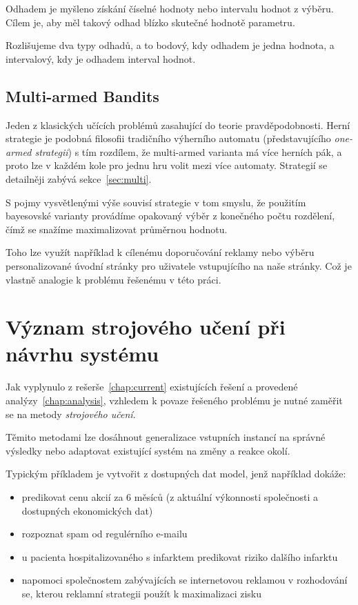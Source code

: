 \documentclass[thesis=M,czech]{FITthesis}[2014/05/07]
\begin{document}
Odhadem je myšleno získání číselné hodnoty nebo intervalu hodnot z výběru. Cílem je, aby měl takový odhad blízko skutečné hodnotě parametru.

Rozlišujeme dva typy odhadů, a to bodový, kdy odhadem je jedna hodnota, a intervalový, kdy je odhadem interval hodnot. 

\subsection{Multi-armed Bandits}
\label{sub:mabandit}
Jeden z klasických učících problémů zasahující do teorie pravděpodobnosti. Herní strategie je podobná filosofii tradičního výherního automatu (představujícího \emph{one-armed strategii}) s tím rozdílem, že multi-armed varianta má více herních pák, a proto lze v každém kole pro jednu hru volit mezi více automaty. Strategií se detailněji zabývá sekce~\ref{sec:multi}.

S pojmy vysvětlenými výše souvisí strategie v tom smyslu, že použitím bayesovské varianty provádíme opakovaný výběr z konečného počtu rozdělení, čímž se snažíme maximalizovat průměrnou hodnotu.

Toho lze využít například k cílenému doporučování reklamy nebo výběru personalizované úvodní stránky pro uživatele vstupujícího na naše stránky. Což je vlastně analogie k problému řešenému v této práci.

\section{Význam strojového učení při návrhu systému}
\label{sec:machine}

Jak vyplynulo z rešerše~\ref{chap:current} existujících řešení a provedené analýzy~\ref{chap:analysis}, vzhledem k povaze řešeného problému je nutné zaměřit se na metody \emph{strojového učení}. 

Těmito metodami lze dosáhnout generalizace vstupních instancí na správné výsledky nebo adaptovat existující systém na změny a reakce okolí. 

Typickým příkladem je vytvořit z dostupných dat model, jenž například dokáže:

\begin{itemize}
  \item predikovat cenu akcií za 6 měsíců (z aktuální výkonnosti společnosti a dostupných ekonomických dat)
  \item rozpoznat spam od regulérního e-mailu
  \item u pacienta hospitalizovaného s infarktem predikovat riziko dalšího infarktu
  \item napomoci společnostem zabývajících se internetovou reklamou v rozhodování se, kterou reklamní strategii použít k maximalizaci zisku
\end{itemize}
\end{document}
